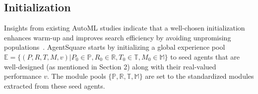 


\subsection{Initialization}
Insights from existing AutoML studies indicate that a well-chosen initialization enhances warm-up and improves search efficiency by avoiding unpromising populations~\citep{so2019evolved,yuan2024evoagent}.
AgentSquare starts by initializing a global experience pool $\mathbb{E} = \{(P,R,T,M,v)|P_0 \in \mathbb{P}, R_0 \in \mathbb{R}, T_0 \in \mathbb{T}, M_0 \in \mathbb{M}\}$ to seed agents that are well-designed (as mentioned in Section 2) along with their real-valued performance $v$.
The module pools $\{\mathbb{P},\mathbb{R},\mathbb{T},\mathbb{M}\}$ are set to the standardized modules extracted from these seed agents.

